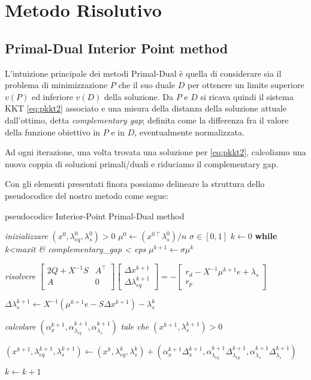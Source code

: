 \section{Metodo Risolutivo}
\subsection{Primal-Dual Interior Point method}
L'intuizione principale dei metodi Primal-Dual è 
quella di considerare sia il problema di minimizzazione
 $P$ che il suo duale $D$ per ottenere un limite 
superiore $v(P)$ ed inferiore $v(D)$ della soluzione.
Da $P$ e $D$ si ricava quindi il sistema KKT \ref{eq:pkkt2} associato e una misura
 della distanza della soluzione attuale dall'ottimo, detta \textit{complementary gap};
  definita come la differenza fra il valore della funzione obiettivo in $P$ e in $D$, eventualmente normalizzata.
  
  Ad ogni iterazione, una volta trovata una soluzione per \ref{eq:pkkt2}, calcoliamo una nuova coppia di soluzioni primali/duali 
  e riduciamo il complementary gap.

  Con gli elementi presentati finora possiamo delineare la struttura dello pseudocodice del nostro metodo come segue:

\begin{algorithm}
\caption{pseudocodice Interior-Point Primal-Dual method}\label{alg:pseudo}
\begin{algorithmic}[1]
\State \textit{inizializzare} $(x^0, \lambda_{eq}^0, \lambda_s^0) > 0$ 
\State $\mu^0 \gets (x^{0\intercal} \lambda_s^0)/n$
\State $\sigma \in [0,1]$
\State $k \gets 0$
\BState \textbf{while} \emph{k<maxit \& complementary\_gap < eps}
\State $\mu^{k+1} \gets \sigma \mu^{k}  $

\State \textit{risolvere} \;$
\begin{bmatrix}
2Q +X^{-1}S & A^\intercal\\
A & 0 \\
\end{bmatrix}\begin{bmatrix}\Delta x^{k+1} \\ \Delta \lambda_{eq}^{k+1}\end{bmatrix}= -
\begin{bmatrix}
    r_d-X^{-1}\mu^{k+1} e + \lambda_s\\r_p
\end{bmatrix}
$

\State $\Delta \lambda_s^{k+1} \gets X^{-1}(\mu^{k+1} e - S\Delta x^{k+1}) - \lambda_s^{k}$ 

\State \textit{calcolare} \; $(\alpha_x^{k+1}, \alpha_{\lambda_{eq}}^{k+1}, \alpha_{\lambda_{s}}^{k+1})$ 
\textit{tale che} $(x^{k+1},\lambda_{s}^{k+1})>0$


\State $(x^{k+1}, \lambda_{eq}^{k+1}, \lambda_{s}^{k+1}) \gets
(x^{k}, \lambda_{eq}^{k}, \lambda_{s}^{k}) + 
(\alpha_x^{k+1}\Delta_x^{k+1}, \alpha_{\lambda_{eq}}^{k+1}\Delta_{\lambda_{eq}}^{k+1}, \alpha_{\lambda_{s}}^{k+1}\Delta_{\lambda_{s}}^{k+1})$

\State $k \gets k + 1$
\EndFunction
\end{algorithmic}
\end{algorithm}

